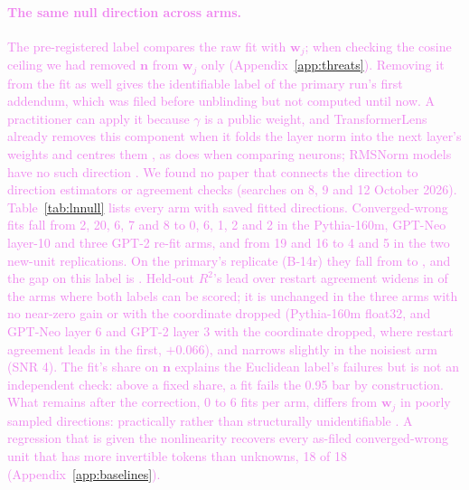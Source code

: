 \documentclass[10pt]{article}
\newcommand{\draft}[1]{\textcolor{violet}{#1}}
\begin{document}
\paragraph{\draft{The same null direction across arms.}} \draft{The pre-registered label
compares the raw fit with $\mathbf{w}_j$; when checking the cosine ceiling we had removed
$\mathbf{n}$ from $\mathbf{w}_j$ only (Appendix~\ref{app:threats}). Removing it from the fit as
well gives the identifiable label of the primary run's first addendum, which was filed before
unblinding but not computed until now. A practitioner can apply it because $\gamma$ is a public weight, and
TransformerLens already removes this component when it folds the layer norm into the next
layer's weights and centres them \citep{nanda2022transformerlens}, as does
\citet{gurnee2024universal} when comparing neurons; RMSNorm models have no such direction
\citep{shirodkar2026dead}. We found no paper that connects the direction to direction estimators
or agreement checks (searches on 8, 9 and 12 October 2026). Table~\ref{tab:lnnull} lists every arm with saved fitted directions. Converged-wrong
fits fall from 2, 20, 6, 7 and 8 to 0, 6, 1, 2 and 2 in the Pythia-160m, GPT-Neo layer-10 and
three GPT-2 re-fit arms, and from 19 and 16 to 4 and 5 in the two new-unit replications. On the primary's replicate
(B-14r) they fall from \bRCwFiled{} to \bRCwIdent{}, and the gap on this label is \bRIdentDelta{}
\bRIdentCI.
Held-out $R^2$'s lead over restart agreement widens in \lnWiden{} of the \lnScorable{} arms where both labels can
be scored; it is unchanged in the three arms with no near-zero gain or with the coordinate
dropped (Pythia-160m float32, and GPT-Neo layer 6 and GPT-2 layer 3 with the coordinate dropped,
where restart agreement leads in the first, $+0.066$), and narrows slightly in the noisiest arm
(SNR 4). The fit's share on $\mathbf{n}$ explains the Euclidean label's failures but is not an
independent check: above a fixed share, a fit fails the 0.95 bar by construction. What remains
after the correction, 0 to 6 fits per arm, differs from $\mathbf{w}_j$ in poorly sampled
directions: practically rather than structurally unidentifiable \citep{raue2009identifiability}.
A regression that is given the nonlinearity recovers every as-filed converged-wrong unit that
has more invertible tokens than unknowns, 18 of 18 (Appendix~\ref{app:baselines}).}
\end{document}
